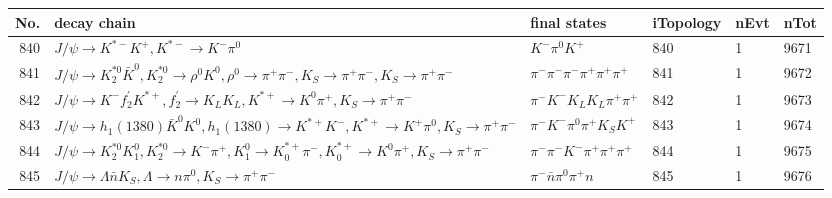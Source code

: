 \begin{table}[htbp] 
\begin{center}
\begin{small}
\begin{tabular}{rlllll}\hline\hline
 No. & decay chain & final states &  iTopology & nEvt & nTot \\\hline
840&$J/\psi       \rightarrow K^{*-}         K^{+}          , K^{*-}          \rightarrow K^{-}          \pi^{0}        $&$K^{-}          \pi^{0}        K^{+}          $&  840&    1& 9671\\
841&$J/\psi       \rightarrow K_2^{*0}       \bar{K}^{0}   , K_2^{*0}        \rightarrow \rho^{0}      K^{0}          , \rho^{0}       \rightarrow \pi^{+}        \pi^{-}        , K_{S}           \rightarrow \pi^{+}        \pi^{-}        , K_{S}           \rightarrow \pi^{+}        \pi^{-}        $&$\pi^{-}        \pi^{-}        \pi^{-}        \pi^{+}        \pi^{+}        \pi^{+}        $&  841&    1& 9672\\
842&$J/\psi       \rightarrow K^{-}          f_2^{'}       K^{*+}         , f_2^{'}        \rightarrow K_{L}          K_{L}          , K^{*+}          \rightarrow K^{0}          \pi^{+}        , K_{S}           \rightarrow \pi^{+}        \pi^{-}        $&$\pi^{-}        K^{-}          K_{L}          K_{L}          \pi^{+}        \pi^{+}        $&  842&    1& 9673\\
843&$J/\psi       \rightarrow h_{1}(1380)    \bar{K}^{0}   K^{0}          , h_{1}(1380)     \rightarrow K^{*+}         K^{-}          , K^{*+}          \rightarrow K^{+}          \pi^{0}        , K_{S}           \rightarrow \pi^{+}        \pi^{-}        $&$\pi^{-}        K^{-}          \pi^{0}        \pi^{+}        K_{S}          K^{+}          $&  843&    1& 9674\\
844&$J/\psi       \rightarrow K_2^{*0}       K_1^{0}        , K_2^{*0}        \rightarrow K^{-}          \pi^{+}        , K_1^{0}         \rightarrow K_{0}^{*+}     \pi^{-}        , K_{0}^{*+}      \rightarrow K^{0}          \pi^{+}        , K_{S}           \rightarrow \pi^{+}        \pi^{-}        $&$\pi^{-}        \pi^{-}        K^{-}          \pi^{+}        \pi^{+}        \pi^{+}        $&  844&    1& 9675\\
845&$J/\psi       \rightarrow \Lambda           \bar{n}          K_{S}          , \Lambda            \rightarrow n                 \pi^{0}        , K_{S}           \rightarrow \pi^{+}        \pi^{-}        $&$\pi^{-}        \bar{n}          \pi^{0}        \pi^{+}        n                 $&  845&    1& 9676\\

\end{tabular}
\end{small}
\end{center}
\end{table}
